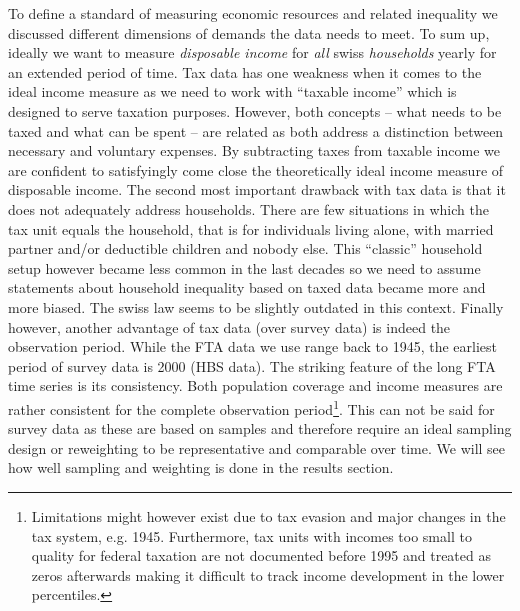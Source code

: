 \documentclass[twoside]{article}\usepackage[]{graphicx}\usepackage[]{color}
\begin{document}
\begin{multicols}{2}
To define a standard of measuring economic resources and related inequality we discussed different dimensions of demands the data needs to meet. To sum up, ideally we want to measure \emph{disposable income} for \emph{all} swiss \emph{households} yearly for an extended period of time. Tax data has one weakness when it comes to the ideal income measure as we need to work with ``taxable income'' which is designed to serve taxation purposes. However, both concepts -- what needs to be taxed and what can be spent -- are related as both address a distinction between necessary and voluntary expenses. By subtracting taxes from taxable income we are confident to satisfyingly come close the theoretically ideal income measure of disposable income. The second most important drawback with tax data is that it does not adequately address households. There are few situations in which the tax unit equals the household, that is for individuals living alone, with married partner and/or deductible children and nobody else. This ``classic'' household setup however became less common in the last decades so we need to assume statements about household inequality based on taxed data became more and more biased. The swiss law seems to be slightly outdated in this context.
Finally however, another advantage of tax data (over survey data) is indeed the observation period. While the FTA data we use range back to 1945, the earliest period of survey data is 2000 (HBS data). The striking feature of the long FTA time series is its consistency. Both population coverage and income measures are rather consistent for the complete observation period\footnote{Limitations might however exist due to tax evasion and major changes in the tax system, e.g. 1945. Furthermore, tax units with incomes too small to quality for federal taxation are not documented before 1995 and treated as zeros afterwards making it difficult to track income development in the lower percentiles.}. This can not be said for survey data as these are based on samples and therefore require an ideal sampling design or reweighting to be representative and comparable over time. We will see how well sampling and weighting is done in the results section.








\end{multicols}
\end{document}
